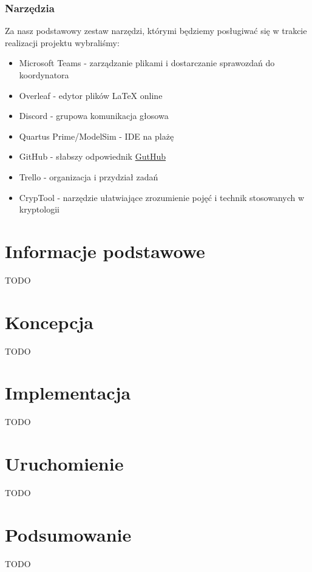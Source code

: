 \documentclass{article}
\begin{document}
\subsubsection{Narzędzia}
\label{sec:narzędzia}
Za nasz podstawowy zestaw narzędzi, którymi będziemy posługiwać się w trakcie realizacji projektu wybraliśmy:
\begin{itemize}
    \item Microsoft Teams - zarządzanie plikami i dostarczanie sprawozdań do koordynatora
    \item Overleaf - edytor plików LaTeX online
    \item Discord - grupowa komunikacja głosowa
    \item Quartus Prime/ModelSim - IDE na plażę
    \item GitHub - słabszy odpowiednik \href{https://guthub.net/}{GutHub}
    \item Trello - organizacja i przydział zadań
    \item CrypTool - narzędzie ułatwiające zrozumienie pojęć i technik stosowanych w kryptologii
\end{itemize}
\section{Informacje podstawowe}
\label{sec:informacje_podstawowe}

TODO

\section{Koncepcja}
\label{sec:koncepcja}

TODO

\section{Implementacja}
\label{sec:implementacja}

TODO

\section{Uruchomienie}
\label{sec:uruchomienie}

TODO 
	
\section{Podsumowanie}
\label{sec:podsumowanie}

TODO


\printbibliography
	
\end{document}
